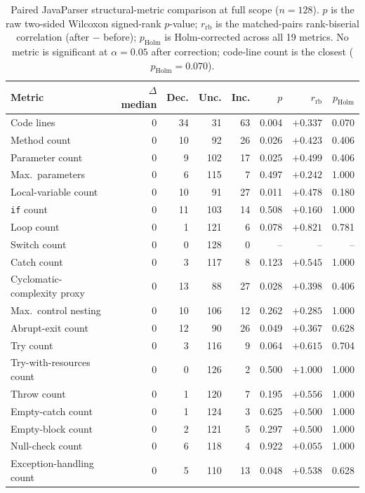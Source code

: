 \begin{table}[htbp]
\centering
\caption{Paired JavaParser structural-metric comparison at full scope ($n=128$).
$p$ is the raw two-sided Wilcoxon signed-rank $p$-value; $r_{\text{rb}}$ is the matched-pairs rank-biserial correlation (after $-$ before); $p_{\text{Holm}}$ is Holm-corrected across all 19 metrics.
No metric is significant at $\alpha=0.05$ after correction; code-line count is the closest ($p_{\text{Holm}}=0.070$).}
\label{tab:ba-full-javaparser}
\small
\begin{tabular}{lrrrrrrr}
\toprule
Metric & $\Delta$ median & Dec. & Unc. & Inc. & $p$ & $r_{\text{rb}}$ & $p_{\text{Holm}}$ \\
\midrule
Code lines                   & $0$ & 34 & 31  & 63 & 0.004 & $+0.337$ & 0.070 \\
Method count                 & $0$ & 10 & 92  & 26 & 0.026 & $+0.423$ & 0.406 \\
Parameter count              & $0$ & 9  & 102 & 17 & 0.025 & $+0.499$ & 0.406 \\
Max.\ parameters             & $0$ & 6  & 115 & 7  & 0.497 & $+0.242$ & 1.000 \\
Local-variable count         & $0$ & 10 & 91  & 27 & 0.011 & $+0.478$ & 0.180 \\
\texttt{if} count            & $0$ & 11 & 103 & 14 & 0.508 & $+0.160$ & 1.000 \\
Loop count                   & $0$ & 1  & 121 & 6  & 0.078 & $+0.821$ & 0.781 \\
Switch count                 & $0$ & 0  & 128 & 0  & --    & --       & --    \\
Catch count                  & $0$ & 3  & 117 & 8  & 0.123 & $+0.545$ & 1.000 \\
Cyclomatic-complexity proxy  & $0$ & 13 & 88  & 27 & 0.028 & $+0.398$ & 0.406 \\
Max.\ control nesting        & $0$ & 10 & 106 & 12 & 0.262 & $+0.285$ & 1.000 \\
Abrupt-exit count            & $0$ & 12 & 90  & 26 & 0.049 & $+0.367$ & 0.628 \\
Try count                    & $0$ & 3  & 116 & 9  & 0.064 & $+0.615$ & 0.704 \\
Try-with-resources count     & $0$ & 0  & 126 & 2  & 0.500 & $+1.000$ & 1.000 \\
Throw count                  & $0$ & 1  & 120 & 7  & 0.195 & $+0.556$ & 1.000 \\
Empty-catch count            & $0$ & 1  & 124 & 3  & 0.625 & $+0.500$ & 1.000 \\
Empty-block count            & $0$ & 2  & 121 & 5  & 0.297 & $+0.500$ & 1.000 \\
Null-check count             & $0$ & 6  & 118 & 4  & 0.922 & $+0.055$ & 1.000 \\
Exception-handling count     & $0$ & 5  & 110 & 13 & 0.048 & $+0.538$ & 0.628 \\
\bottomrule
\end{tabular}
\end{table}

